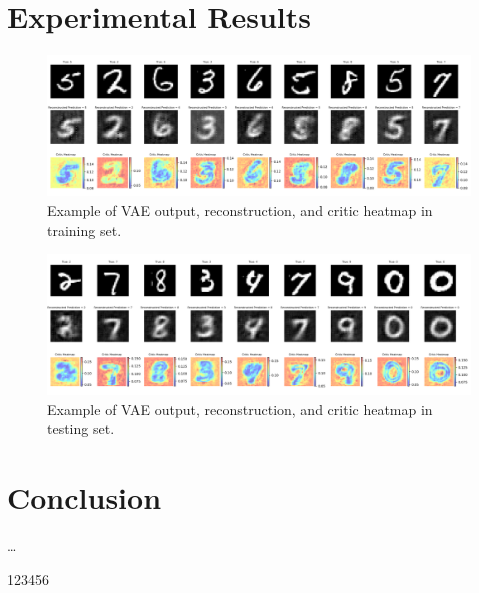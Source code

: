 \documentclass[12pt]{article}
\numberwithin{equation}{section}
\begin{document}
\section{Experimental Results}
\begin{figure}[H]
    \centering
    \includegraphics[width=\textwidth]{../fig/comparison_images_v1_cat_sum_training1.png}
    \caption{Example of VAE output, reconstruction, and critic heatmap in training set.}
    \label{fig:vae_example2}
\end{figure}

\begin{figure}[H]
    \centering
    \includegraphics[width=\textwidth]{../fig/comparison_images_v1_cat_sum.png}
    \caption{Example of VAE output, reconstruction, and critic heatmap in testing set.}
    \label{fig:vae_example1}
\end{figure}


\section{Conclusion}
\ldots

123456

\newpage
\begin{footnotesize} %
\singlespacing %

\setlength{\bibsep}{5pt} %
\thispagestyle{empty} %
\end{footnotesize} %
\end{document}
